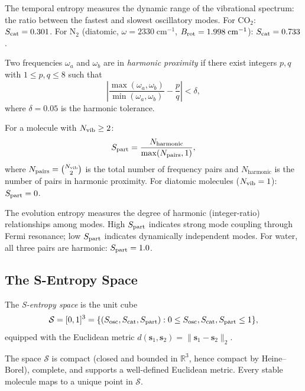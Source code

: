 The temporal entropy measures the dynamic range of the vibrational spectrum:
the ratio between the fastest and slowest oscillatory modes.  For CO$_2$:
$S_{\mathrm{cat}} = 0.301$.  For N$_2$ (diatomic, $\omega = 2330\;\mathrm{cm}^{-1}$,
$B_{\mathrm{rot}} = 1.998\;\mathrm{cm}^{-1}$): $S_{\mathrm{cat}} = 0.733$.

\begin{definition}
\label{def:ch23-harmonic}
Two frequencies $\omega_a$ and $\omega_b$ are in \emph{harmonic proximity}
if there exist integers $p, q$ with $1 \leq p, q \leq 8$ such that
\[
  \left|\frac{\max(\omega_a,\omega_b)}{\min(\omega_a,\omega_b)} -
        \frac{p}{q}\right| < \delta,
\]
where $\delta = 0.05$ is the harmonic tolerance.
\end{definition}

\begin{definition}
\label{def:ch23-se}
For a molecule with $N_{\mathrm{vib}} \geq 2$:
\[
  S_{\mathrm{part}} = \frac{N_{\mathrm{harmonic}}}{\max(N_{\mathrm{pairs}},1)},
\]
where $N_{\mathrm{pairs}} = \binom{N_{\mathrm{vib}}}{2}$ is the total number of
frequency pairs and $N_{\mathrm{harmonic}}$ is the number of pairs in
harmonic proximity.  For diatomic molecules ($N_{\mathrm{vib}} = 1$): $S_{\mathrm{part}} = 0$.
\end{definition}

The evolution entropy measures the degree of harmonic (integer-ratio)
relationships among modes.  High $S_{\mathrm{part}}$ indicates strong mode coupling through
Fermi resonance; low $S_{\mathrm{part}}$ indicates dynamically independent modes.  For
water, all three pairs are harmonic: $S_{\mathrm{part}} = 1.0$.

\subsection{The S-Entropy Space}
\label{sec:ch23-space}

\begin{definition}
\label{def:ch23-space}
The \emph{S-entropy space} is the unit cube
\[
  \mathcal{S} = [0,1]^3 = \{(S_{\mathrm{osc}}, S_{\mathrm{cat}}, S_{\mathrm{part}}) :
    0 \leq S_{\mathrm{osc}}, S_{\mathrm{cat}}, S_{\mathrm{part}} \leq 1\},
\]
equipped with the Euclidean metric $d(\mathbf{s}_1, \mathbf{s}_2) =
\|\mathbf{s}_1 - \mathbf{s}_2\|_2$.
\end{definition}

The space $\mathcal{S}$ is compact (closed and bounded in $\mathbb{R}^3$,
hence compact by Heine--Borel), complete, and supports a well-defined
Euclidean metric.  Every stable molecule maps to a unique point in
$\mathcal{S}$.

